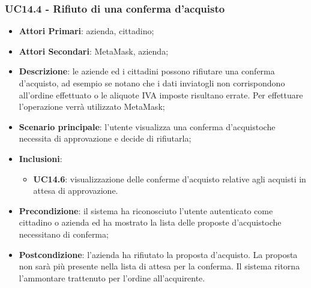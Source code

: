 \subsubsection{UC14.4 - Rifiuto di una conferma d'acquisto}
\begin{itemize}
	\item \textbf{Attori Primari}: azienda, cittadino;
	\item \textbf{Attori Secondari}: MetaMask\glo, azienda;
	\item \textbf{Descrizione}: le aziende ed i cittadini possono rifiutare una conferma d'acquisto\glo, ad esempio se notano che i dati inviatogli non corrispondono all'ordine effettuato o le aliquote IVA imposte risultano errate. Per effettuare l'operazione verrà utilizzato MetaMask\glo;
	\item \textbf{Scenario principale}: l'utente visualizza una conferma d'acquisto\glosp che necessita di approvazione e decide di rifiutarla;
	\item \textbf{Inclusioni}: 
	\begin{itemize}
		\item \textbf{UC14.6}: visualizzazione delle conferme d'acquisto 
		relative agli acquisti in attesa di approvazione.
	\end{itemize}
	\item \textbf{Precondizione}: il sistema ha riconosciuto l'utente autenticato come cittadino o azienda ed ha mostrato la lista delle proposte d'acquisto\glosp che necessitano di conferma;
	\item \textbf{Postcondizione}: l'azienda ha rifiutato la proposta 
	d'acquisto\glo. La proposta non sarà più presente nella lista di attesa per 
	la conferma. Il sistema ritorna l'ammontare trattenuto per l'ordine 
	all'acquirente.
\end{itemize}
